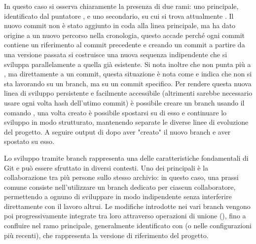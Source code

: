 In questo caso si osserva chiaramente la presenza di due rami: uno principale, identificato dal puntatore , e uno secondario, su cui si trova attualmente . Il nuovo commit non è stato aggiunto in coda alla linea principale, ma ha dato origine a un nuovo percorso nella cronologia, questo accade perché ogni commit contiene un riferimento al commit precedente e creando un commit a partire da una versione passata si costruisce una nuova sequenza indipendente che si sviluppa parallelamente a quella già esistente.
Si nota inoltre che  non punta più a , ma direttamente a un commit, questa situazione è nota come  e indica che non si sta lavorando su un branch, ma su un commit specifico. Per rendere questa nuova linea di sviluppo persistente e facilmente accessibile (altrimenti sarebbe necessario usare ogni volta hash dell'utimo commit) è possibile creare un branch usando il comando , una volta creato è possibile spostarsi su di esso e continuare lo sviluppo in modo strutturato, mantenendo separate le diverse linee di evoluzione del progetto. A seguire output di  dopo aver "creato" il nuovo branch e aver spostato  su esso.

Lo sviluppo tramite branch rappresenta una delle caratteristiche fondamentali di Git e può essere sfruttato in diversi contesti. Uno dei principali è la collaborazione tra più persone sullo stesso archivio: in questo caso, una prassi comune consiste nell'utilizzare un branch dedicato per ciascun collaboratore, permettendo a ognuno di sviluppare in modo indipendente senza interferire direttamente con il lavoro altrui. Le modifiche introdotte nei vari branch vengono poi progressivamente integrate tra loro attraverso operazioni di unione (), fino a confluire nel ramo principale, generalmente identificato con  (o  nelle configurazioni più recenti), che rappresenta la versione di riferimento del progetto.




